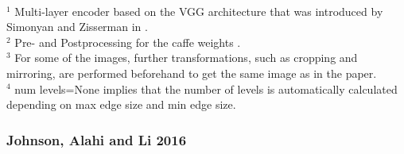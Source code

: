\begin{landscape}
\begin{table*}[!t]
\begin{tabular}{c|c|c}
			\hline
		\end{tabular}
	\raggedright
		\footnotesize{
			\\$^1$ Multi-layer encoder based on the VGG architecture that was introduced by
			Simonyan and Zisserman in \cite{SZ2015}.
			\\$^2$ Pre- and Postprocessing for the caffe weights \cite{SZ2015}.
			\\$^3$ For some of the images, further transformations, such as cropping and mirroring, are performed beforehand to get the same image as in the paper.
			\\$^4$ num levels=None implies that the number of levels is automatically calculated depending on max edge size and min edge size.
		}
	\end{table*}
\end{landscape}

\subsubsection{Johnson, Alahi and Li 2016}

